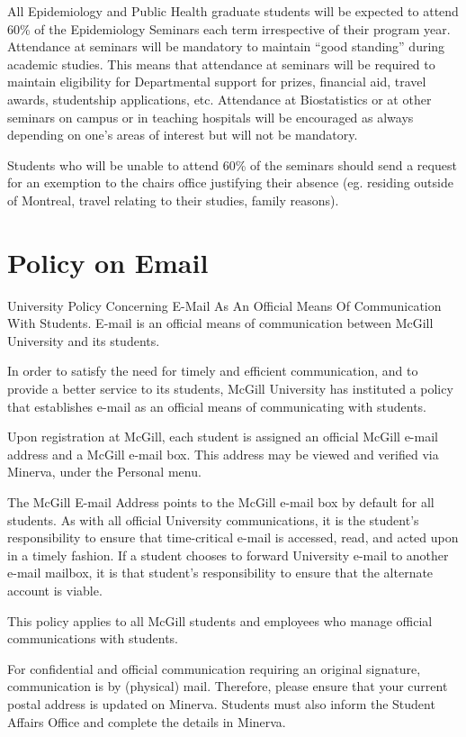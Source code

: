 \documentclass[
  openany]{book}
\begin{document}
All Epidemiology and Public Health graduate students will be expected to attend 60\% of the Epidemiology Seminars each term irrespective of their program year. Attendance at seminars will be mandatory to maintain ``good standing'' during academic studies. This means that attendance at seminars will be required to maintain eligibility for Departmental support for prizes, financial aid, travel awards, studentship applications, etc. Attendance at Biostatistics or at other seminars on campus or in teaching hospitals will be encouraged as always depending on one's areas of interest but will not be mandatory.

Students who will be unable to attend 60\% of the seminars should send a request for an exemption to the chairs office justifying their absence (eg. residing outside of Montreal, travel relating to their studies, family reasons).

\hypertarget{policy-on-email}{%
\section{Policy on Email}\label{policy-on-email}}

University Policy Concerning E-Mail As An Official Means Of Communication With Students. E-mail is an official means of communication between McGill University and its students.

In order to satisfy the need for timely and efficient communication, and to provide a better service to its students, McGill University has instituted a policy that establishes e-mail as an official means of communicating with students.

Upon registration at McGill, each student is assigned an official McGill e-mail address and a McGill e-mail box. This address may be viewed and verified via Minerva, under the Personal menu.

The McGill E-mail Address points to the McGill e-mail box by default for all students. As with all official University communications, it is the student's responsibility to ensure that time-critical e-mail is accessed, read, and acted upon in a timely fashion. If a student chooses to forward University e-mail to another e-mail mailbox, it is that student's responsibility to ensure that the alternate account is viable.

This policy applies to all McGill students and employees who manage official communications with students.

For confidential and official communication requiring an original signature, communication is by (physical) mail. Therefore, please ensure that your current postal address is updated on Minerva. Students must also inform the Student Affairs Office and complete the details in Minerva.
\end{document}
